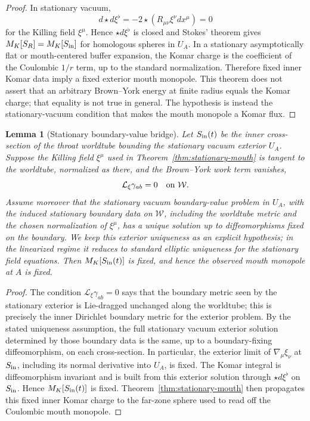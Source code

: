 \documentclass[aps,prd,onecolumn,nofootinbib,superscriptaddress]{revtex4-2}
\newtheorem{lemma}{Lemma}
\begin{document}
\begin{proof}
In stationary vacuum,
\begin{equation}
  d\star d\xi^\flat = -2\star(R_{\mu\nu}\xi^\nu dx^\mu)=0
\end{equation}
for the Killing field $\xi^\mu$.  Hence $\star d\xi^\flat$ is closed and
Stokes' theorem gives $M_K[S_R]=M_K[S_{\rm in}]$ for homologous spheres in
$U_A$.  In a stationary asymptotically flat or mouth-centered buffer expansion,
the Komar charge is the coefficient of the Coulombic $1/r$ term, up to the
standard normalization.  Therefore fixed inner Komar data imply a fixed
exterior mouth monopole.  This theorem does not assert that an arbitrary
Brown--York energy at finite radius equals the Komar charge; that equality is
not true in general.  The hypothesis is instead the stationary-vacuum condition
that makes the mouth monopole a Komar flux.
\end{proof}

\begin{lemma}[Stationary boundary-value bridge]
\label{lem:stationary-bridge}
Let $S_{\rm in}(t)$ be the inner cross-section of the throat worldtube bounding
the stationary vacuum exterior $U_A$.  Suppose the Killing field $\xi^\mu$ used
in Theorem~\ref{thm:stationary-mouth} is tangent to the worldtube, normalized
as there, and the Brown--York work term vanishes,
\begin{equation}
  \mathcal{L}_\xi\gamma_{ab}=0
  \quad\hbox{on }\mathcal{W}.
\end{equation}
Assume moreover that the stationary vacuum boundary-value problem in $U_A$,
with the induced stationary boundary data on $\mathcal{W}$, including the
worldtube metric and the chosen normalization of $\xi^\mu$, has a unique
solution up to diffeomorphisms fixed on the boundary.  We keep this exterior
uniqueness as an explicit hypothesis; in the linearized regime it reduces to
standard elliptic uniqueness for the stationary field equations.  Then
$M_K[S_{\rm in}(t)]$ is fixed, and hence the observed mouth monopole at $A$ is
fixed.
\end{lemma}

\begin{proof}
The condition $\mathcal{L}_\xi\gamma_{ab}=0$ says that the boundary metric
seen by the stationary exterior is Lie-dragged unchanged along the worldtube;
this is precisely the inner Dirichlet boundary metric for the exterior problem.
By the stated uniqueness assumption, the full stationary vacuum exterior
solution determined by those boundary data is the same, up to a
boundary-fixing diffeomorphism, on each cross-section.  In particular, the
exterior limit of $\nabla_\mu\xi_\nu$ at $S_{\rm in}$, including its normal
derivative into $U_A$, is fixed.  The Komar integral is diffeomorphism
invariant and is built from this exterior solution through
$\star d\xi^\flat$ on $S_{\rm in}$.  Hence $M_K[S_{\rm in}(t)]$ is fixed.
Theorem~\ref{thm:stationary-mouth} then propagates this fixed inner Komar
charge to the far-zone sphere used to read off the Coulombic mouth monopole.
\end{proof}
\end{document}
